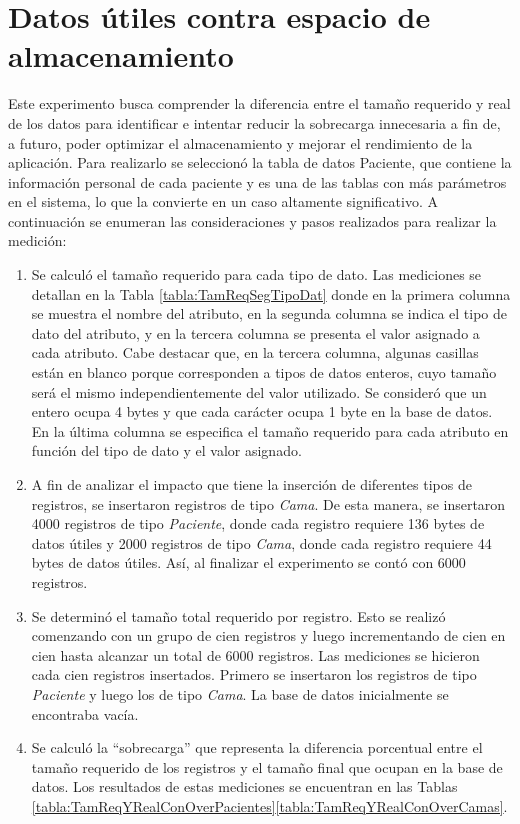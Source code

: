 \section{Datos útiles contra espacio de almacenamiento}
\label{sec:datosUtilesVSalmacenamiento}
Este experimento busca comprender la diferencia entre el tamaño requerido y real de los datos para identificar e intentar reducir la sobrecarga innecesaria a fin de, a futuro, poder optimizar el almacenamiento y mejorar el rendimiento de la aplicación. Para realizarlo se seleccionó la tabla de datos Paciente, que contiene la información personal de cada paciente y es una de las tablas con más parámetros en el sistema, lo que la convierte en un caso altamente significativo. A continuación se enumeran las consideraciones y pasos realizados para realizar la medición:
\begin{enumerate}
    \item Se calculó el tamaño requerido para cada tipo de dato. Las mediciones se detallan en la Tabla \ref{tabla:TamReqSegTipoDat} donde en la primera columna se muestra el nombre del atributo, en la segunda columna se indica el tipo de dato del atributo, y en la tercera columna se presenta el valor asignado a cada atributo. Cabe destacar que, en la tercera columna, algunas casillas están en blanco porque corresponden a tipos de datos enteros, cuyo tamaño será el mismo independientemente del valor utilizado. Se consideró que un entero ocupa 4 bytes y que cada carácter ocupa 1 byte en la base de datos. En la última columna se especifica el tamaño requerido para cada atributo en función del tipo de dato y el valor asignado. 
    
    \item A fin de analizar el impacto que tiene la inserción de diferentes tipos de registros, se insertaron registros de tipo \textit{Cama}. De esta manera, se insertaron 4000 registros de tipo \textit{Paciente}, donde cada registro requiere 136 bytes de datos útiles y 2000 registros de tipo \textit{Cama}, donde cada registro requiere 44 bytes de datos útiles. Así, al finalizar el experimento se contó con 6000 registros. 
    
    \item Se determinó el tamaño total requerido por registro. Esto se realizó comenzando con un grupo de cien registros y luego incrementando de cien en cien hasta alcanzar un total de 6000 registros. Las mediciones se hicieron cada cien registros insertados. Primero se insertaron los registros de tipo \textit{Paciente} y luego los de tipo \textit{Cama}. La base de datos inicialmente se encontraba vacía.
    
    \item Se calculó la ``sobrecarga'' que representa la diferencia porcentual entre el tamaño requerido de los registros y el tamaño final que ocupan en la base de datos. Los resultados de estas mediciones se encuentran en las Tablas \ref{tabla:TamReqYRealConOverPacientes}\ref{tabla:TamReqYRealConOverCamas}.
\end{enumerate}

